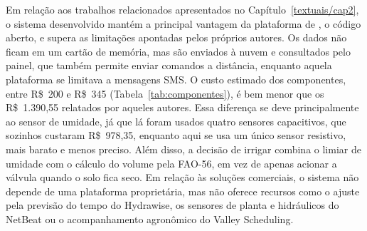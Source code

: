 Em relação aos trabalhos relacionados apresentados no Capítulo~\ref{textuais/cap2}, o sistema desenvolvido mantém a principal vantagem da plataforma de , o código aberto, e supera as limitações apontadas pelos próprios autores. Os dados não ficam em um cartão de memória, mas são enviados à nuvem e consultados pelo painel, que também permite enviar comandos a distância, enquanto aquela plataforma se limitava a mensagens SMS. O custo estimado dos componentes, entre R\$~200 e R\$~345 (Tabela~\ref{tab:componentes}), é bem menor que os R\$~1.390,55 relatados por aqueles autores. Essa diferença se deve principalmente ao sensor de umidade, já que lá foram usados quatro sensores capacitivos, que sozinhos custaram R\$~978,35, enquanto aqui se usa um único sensor resistivo, mais barato e menos preciso. Além disso, a decisão de irrigar combina o limiar de umidade com o cálculo do volume pela FAO-56, em vez de apenas acionar a válvula quando o solo fica seco. Em relação às soluções comerciais, o sistema não depende de uma plataforma proprietária, mas não oferece recursos como o ajuste pela previsão do tempo do Hydrawise, os sensores de planta e hidráulicos do NetBeat ou o acompanhamento agronômico do Valley Scheduling.

